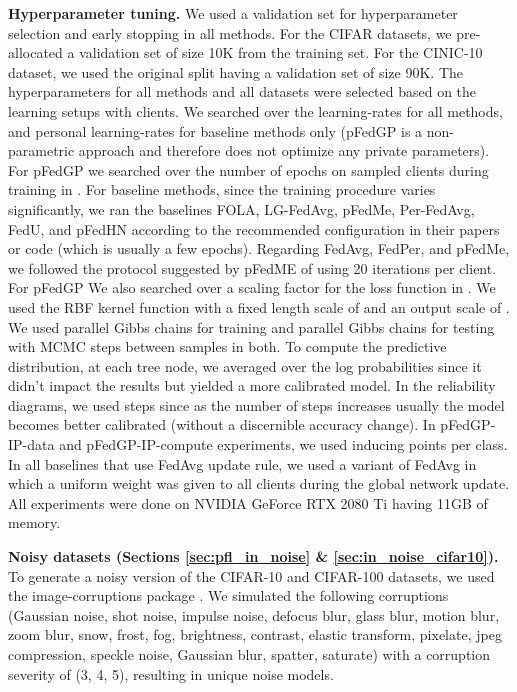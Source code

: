 \documentclass{article}
\begin{document}
\textbf{Hyperparameter tuning.} We used a validation set for hyperparameter selection and early stopping in all methods. For the CIFAR datasets, we pre-allocated a validation set of size 10K from the training set. For the CINIC-10 dataset, we used the original split having a validation set of size 90K. The hyperparameters for all methods and all datasets were selected based on the learning setups with  clients. We searched over the learning-rates  for all methods, and personal learning-rates  for baseline methods only (pFedGP is a non-parametric approach and therefore does not optimize any private parameters). For pFedGP we searched over the number of epochs on sampled clients during training in . For baseline methods, since the training procedure varies significantly, we ran the baselines FOLA, LG-FedAvg, pFedMe, Per-FedAvg, FedU, and pFedHN according to the recommended configuration in their papers or code (which is usually a few epochs). Regarding FedAvg, FedPer, and pFedMe, we followed the protocol suggested by pFedME of using 20 iterations per client. For pFedGP We also searched over a scaling factor for the loss function in . We used the RBF kernel function with a fixed length scale of  and an output scale of . We used  parallel Gibbs chains for training and  parallel Gibbs chains for testing with  MCMC steps between samples in both. To compute the predictive distribution, at each tree node, we averaged over the log probabilities since it didn't impact the results but yielded a more calibrated model. In the reliability diagrams, we used  steps since as the number of steps increases usually the model becomes better calibrated (without a discernible accuracy change). In pFedGP-IP-data and pFedGP-IP-compute experiments, we used  inducing points per class. In all baselines that use FedAvg update rule, we used a variant of FedAvg in which a uniform weight was given to all clients during the global network update.
All experiments were done on NVIDIA GeForce RTX 2080 Ti having 11GB of memory.

\textbf{Noisy datasets (Sections \ref{sec:pfl_in_noise} \& \ref{sec:in_noise_cifar10}).} To generate a noisy version of the CIFAR-10 and CIFAR-100 datasets, we used the image-corruptions package \cite{hendrycks2018benchmarking}. We simulated the following  corruptions (Gaussian noise, shot noise, impulse noise, defocus blur, glass blur, motion blur, zoom blur, snow, frost, fog,
brightness, contrast, elastic transform, pixelate, jpeg compression,
speckle noise, Gaussian blur, spatter, saturate) with a corruption severity of (3, 4, 5), resulting in  unique noise models.
\end{document}
